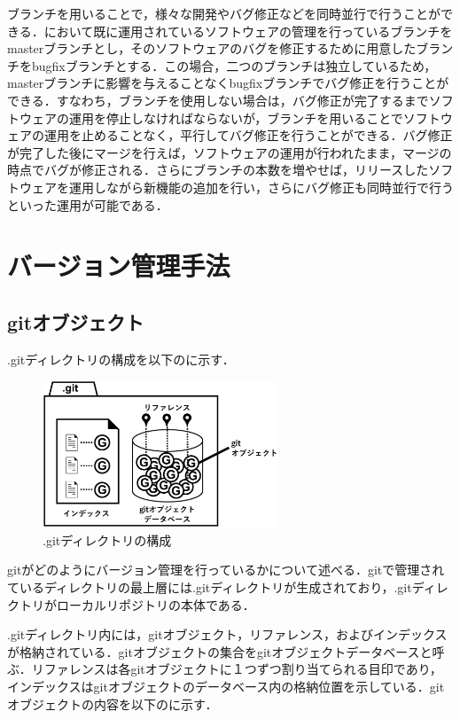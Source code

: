 \documentclass[a4j,9pt,twocolumn]{jsarticle}
\begin{document}
ブランチを用いることで，様々な開発やバグ修正などを同時並行で行うことができる．において既に運用されているソフトウェアの管理を行っているブランチをmasterブランチとし，そのソフトウェアのバグを修正するために用意したブランチをbugfixブランチとする．この場合，二つのブランチは独立しているため，masterブランチに影響を与えることなくbugfixブランチでバグ修正を行うことができる．すなわち，ブランチを使用しない場合は，バグ修正が完了するまでソフトウェアの運用を停止しなければならないが，ブランチを用いることでソフトウェアの運用を止めることなく，平行してバグ修正を行うことができる．バグ修正が完了した後にマージを行えば，ソフトウェアの運用が行われたまま，マージの時点でバグが修正される．さらにブランチの本数を増やせば，リリースしたソフトウェアを運用しながら新機能の追加を行い，さらにバグ修正も同時並行で行うといった運用が可能である．

\section{バージョン管理手法}
\subsection{gitオブジェクト}
.gitディレクトリの構成を以下のに示す．

\begin{figure}[h]
\centering
\includegraphics[width=70mm]{img/git_obj.eps}
\caption{.gitディレクトリの構成}
\label{object1}
\end{figure}

gitがどのようにバージョン管理を行っているかについて述べる\cite{mecha}．gitで管理されているディレクトリの最上層には.gitディレクトリが生成されており，.gitディレクトリがローカルリポジトリの本体である．

.gitディレクトリ内には，gitオブジェクト，リファレンス，およびインデックスが格納されている．gitオブジェクトの集合をgitオブジェクトデータベースと呼ぶ．リファレンスは各gitオブジェクトに１つずつ割り当てられる目印であり，インデックスはgitオブジェクトのデータベース内の格納位置を示している．gitオブジェクトの内容を以下のに示す．
\end{document}
